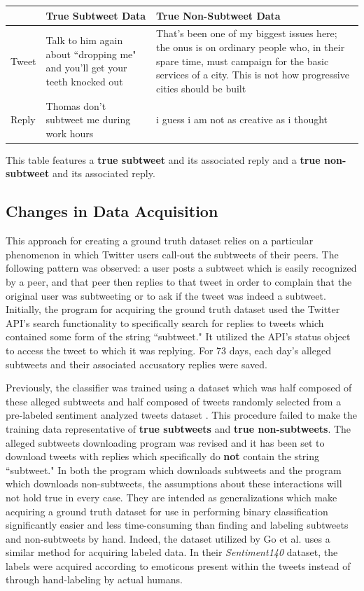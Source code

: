 \documentclass[11pt, twoside, reqno]{book}
\begin{document}
\begin{center}
	\begin{tabular}{ | p{5em} | p{15em} | p{15em} | }
		\hline
		& True Subtweet Data& True Non-Subtweet Data
		\\ 
		\hline
		Tweet&Talk to him again about ``dropping me" and you'll get your teeth knocked out&That's been one of my biggest issues here; the onus is on ordinary people who, in their spare time, must campaign for the basic services of a city. This is not how progressive cities should be built 
		\\ 
		\hline
		Reply&Thomas don't subtweet me during work hours&i guess i am not as creative as i thought
		\\
		\hline
	\end{tabular}
\end{center}

\noindent
This table features a \textbf{true subtweet} and its associated reply and a \textbf{true non-subtweet} and its associated reply.

\subsection{Changes in Data Acquisition}
\label{changes_in_data}

This approach for creating a ground truth dataset relies on a particular phenomenon in which Twitter users call-out the subtweets of their peers. The following pattern was observed: a user posts a subtweet which is easily recognized by a peer, and that peer then replies to that tweet in order to complain that the original user was subtweeting or to ask if the tweet was indeed a subtweet. Initially, the program for acquiring the ground truth dataset used the Twitter API's search functionality to specifically search for replies to tweets which contained some form of the string ``subtweet." It utilized the API's status object to access the tweet to which it was replying. For 73 days, each day's alleged subtweets and their associated accusatory replies were saved.

Previously, the classifier was trained using a dataset which was half composed of these alleged subtweets and half composed of tweets randomly selected from a pre-labeled sentiment analyzed tweets dataset \cite{go_dataset}. This procedure failed to make the training data representative of \textbf{true subtweets} and \textbf{true non-subtweets}. The alleged subtweets downloading program was revised and it has been set to download tweets with replies which specifically do \textbf{not} contain the string ``subtweet." In both the program which downloads subtweets and the program which downloads non-subtweets, the assumptions about these interactions will not hold true in every case. They are intended as generalizations which make acquiring a ground truth dataset for use in performing binary classification significantly easier and less time-consuming than finding and labeling subtweets and non-subtweets by hand. Indeed, the dataset utilized by Go et al. uses a similar method for acquiring labeled data. In their \textit{Sentiment140} dataset, the labels were acquired according to emoticons present within the tweets instead of through hand-labeling by actual humans. 
\end{document}
